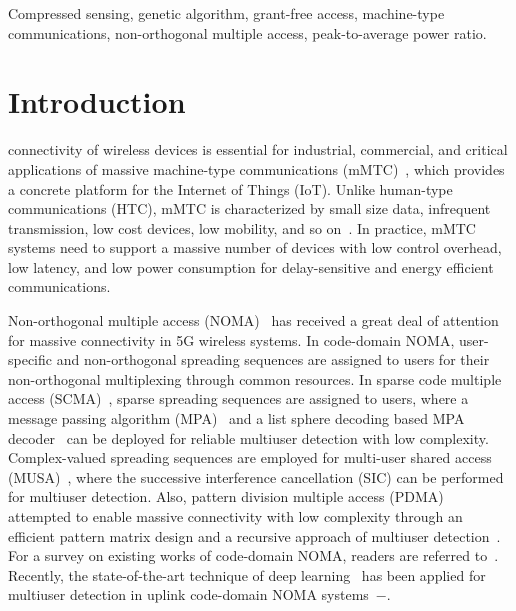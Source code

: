 \documentclass[journal]{IEEEtran}
\numberwithin{const2}{const}
\begin{document}
\begin{IEEEkeywords}
Compressed sensing, genetic algorithm, grant-free access, machine-type communications, non-orthogonal multiple access, 
peak-to-average power ratio. 
\end{IEEEkeywords}


\IEEEpeerreviewmaketitle



\section{Introduction}


 connectivity of wireless devices
is essential for industrial, commercial, and critical applications
of massive machine-type communications (mMTC)~\cite{Kunz:MTC, Bockel:mMTC},
which provides a concrete platform for the Internet of Things (IoT).
Unlike human-type communications (HTC), 
mMTC is characterized by small size data, infrequent transmission, low cost devices,
low mobility, and so on~\cite{3gpp:22368}.
In practice,
mMTC systems need to support a massive number of devices with low control overhead, low latency,
and low power consumption for delay-sensitive and energy efficient communications.


Non-orthogonal multiple access (NOMA)~\cite{Dai:noma, Dai:survey} has received a great deal of attention 
for massive connectivity in 5G wireless systems.
In code-domain NOMA, user-specific and
non-orthogonal spreading sequences
are assigned to users for their non-orthogonal multiplexing through common resources. 
In sparse code multiple access (SCMA)~\cite{Baligh:SCMA}, 
sparse spreading sequences are assigned to users, %
where a message passing algorithm (MPA)~\cite{Zhang:MPA} and a list sphere decoding based MPA decoder~\cite{Wei:SCMA}
can be deployed for reliable multiuser detection with low complexity.  
Complex-valued spreading sequences are employed for 
multi-user shared access (MUSA)~\cite{Yuan:MUSA}, 
where the successive interference cancellation (SIC) can be performed for multiuser detection. 
Also, pattern division multiple access (PDMA)~\cite{Kang:PDMA} attempted
to enable massive connectivity with low complexity through an efficient pattern matrix design 
and a recursive approach of multiuser detection~\cite{Jamali:PDMA}.
For a survey on existing works of code-domain NOMA, readers are referred to~\cite{Dai:survey}.
Recently, the state-of-the-art technique of deep learning~\cite{Bengjo:DL} has been applied
for multiuser detection in uplink code-domain NOMA systems~\cite{Ye:deep}$-$\cite{Siva:dnn}.
\end{document}
